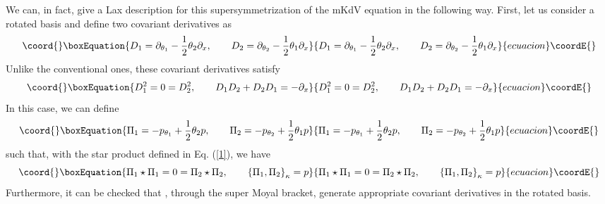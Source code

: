 \documentclass[a4paper,11pt]{article}
\begin{document}
We can, in fact, give a Lax description for this supersymmetrization
of the mKdV equation \cite{20} in the following way. First, let us
consider  a
rotated  basis and define two covariant derivatives as
\begin{equation}\coord{}\boxEquation{
D_{1} = \partial_{\theta_{1}} - {1\over 2} \theta_{2}
\partial_{x},\qquad D_{2} = \partial_{\theta_{2}} - {1\over 2}
\theta_{1} \partial_{x}
}{
D_{1} = \partial_{\theta_{1}} - {1\over 2} \theta_{2}
\partial_{x},\qquad D_{2} = \partial_{\theta_{2}} - {1\over 2}
\theta_{1} \partial_{x}
}{ecuacion}\coordE{}\end{equation}
Unlike the conventional ones, these covariant derivatives satisfy
\begin{equation}\coord{}\boxEquation{
D_{1}^{2} = 0 = D_{2}^{2},\qquad D_{1}D_{2}+D_{2}D_{1} = -
\partial_{x}
}{
D_{1}^{2} = 0 = D_{2}^{2},\qquad D_{1}D_{2}+D_{2}D_{1} = -
\partial_{x}
}{ecuacion}\coordE{}\end{equation}
In this case, we can define
\begin{equation}\coord{}\boxEquation{
\Pi_{1} = - p_{\theta_{1}} + {1\over 2} \theta_{2} p,\qquad \Pi_{2} =
- p_{\theta_{2}} + {1\over 2} \theta_{1} p
}{
\Pi_{1} = - p_{\theta_{1}} + {1\over 2} \theta_{2} p,\qquad \Pi_{2} =
- p_{\theta_{2}} + {1\over 2} \theta_{1} p
}{ecuacion}\coordE{}\end{equation}
such that, with the star product defined in Eq. (\ref{1}), we have
\begin{equation}\coord{}\boxEquation{
\Pi_{1}\star \Pi_{1} = 0 = \Pi_{2}\star \Pi_{2},\qquad
\left\{\Pi_{1},\Pi_{2}\right\}_{\kappa} = p
}{
\Pi_{1}\star \Pi_{1} = 0 = \Pi_{2}\star \Pi_{2},\qquad
\left\{\Pi_{1},\Pi_{2}\right\}_{\kappa} = p
}{ecuacion}\coordE{}\end{equation}
Furthermore, it can be checked that \coordHE{}, through the super
Moyal bracket, generate appropriate covariant derivatives in the
rotated basis.
\end{document}
